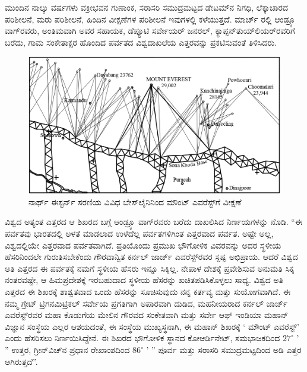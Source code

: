 ಮುಂದಿನ ನಾಲ್ಕು ವರ್ಷಗಳು ವಕ್ರೀಭವನ ಗುಣಾಂಕ, ಸರಾಸರಿ ಸಮುದ್ರಮಟ್ಟದ ಡೇಟಮ್‌ನ ನಿಗಧಿ, ಲೆಕ್ಕಾಚಾರದ ಪರಿಶೀಲನೆ, ಮರು ಪರಿಶೀಲನೆ, ಹಿಂದಿನ ವೀಕ್ಷಣೆಗಳ ಪರಿಶೀಲನೆ ಇವುಗಳಲ್ಲಿ ಕಳೆಯುತ್ತದೆ. ಮಾರ್ಚ್ ರಲ್ಲಿ ಆಂಡ್ರ್ಯೂ ವಾಗ್​ರವರು, ಅಂತಿಮವಾಗಿ ಅವರ ಸಹಾಯಕ, ಡೆಪ್ಯೂಟಿ ಸರ್ವೇಯರ್​ ಜನರಲ್​, ಕ್ಯಾಪ್ಟನ್​ ತುಯ್​ಲಿಯರ್​\break ರವರಿಗೆ ಬರೆದು, ಗಾಮ ಸಂಕೇತಾಕ್ಷರ ಹೊಂದಿದ ಪರ್ವತದ ವಿಶ್ವದಾಖಲೆಯ ಎತ್ತರವನ್ನು ಪ್ರಕಟಿಸುವಂತೆ ತಿಳಿಸಿದರು.

\begin{figure}[!htbp]
\includegraphics{"images/image020.jpg"}
\caption{ನಾರ್ಥ್ ಈಸ್ಟರ್ನ್ ಸರಣಿಯ ವಿವಿಧ ಬೇಸ್‌ಲೈನಿನಿಂದ ಮೌಂಟ್​ ಎವರೆಸ್ಟ್​ಗೆ ವೀಕ್ಷಣೆ}\label{art15-fig2}
\end{figure}

\newpage

ವಿಶ್ವದ ಅತ್ಯಂತ ಎತ್ತರದ ಆ ಶಿಖರದ ಬಗ್ಗೆ ಆಂಡ್ರ್ಯೂ ವಾಗ್​ರವರು ಬರೆದು ದಾಖಲಿಸಿದ ನಿರ್ಣಯಗಳನ್ನು ನೊಡಿ. “ಈ ಪರ್ವತವು ಭಾರತದಲ್ಲಿ ಅಳತೆ ಮಾಡಲಾದ ಉಳೆದೆಲ್ಲ ಪರ್ವತಗಳಿಗಿಂತ ಎತ್ತರವಾದ ಪರ್ವತ. ಅಷ್ಟೇ ಅಲ್ಲ, ವಿಶ್ವದಲ್ಲಿಯೇ ಎತ್ತರವಾದ ಪರ್ವತವಾಗಿದೆ. ಪ್ರತಿಯೊಂದು ಪ್ರಮುಖ ಭೌಗೋಳಿಕ ವಿವರವನ್ನು ಅದರ ಸ್ಥಳೀಯ ಹೆಸರಿನಿಂದಲೇ ಗುರುತಿಸಬೇಕೆಂದು ಗೌರವಾನ್ವಿತ ಕರ್ನಲ್​ ಜಾರ್ಜ್ ಎವರೆಸ್ಟ್​ರವರ ಸ್ಪಷ್ಟ ಅಭಿಪ್ರಾಯ. ಆದರೆ ವಿಶ್ವದ ಅತಿ ಎತ್ತರದ ಈ ಪರ್ವತಕ್ಕೆ ನಮಗೆ ಸ್ಥಳೀಯ ಹೆಸರು ಇನ್ನೂ ಸಿಕ್ಕಿಲ್ಲ. ನೇಪಾಳ ದೇಶಕ್ಕೆ ಪ್ರವೇಶಿಸುವ ಅನುಮತಿ ಸಿಕ್ಕ ನಂತರವಷ್ಟೇ, ಆ ಹಿಮಪ್ರದೇಶಕ್ಕೆ ಇರಬಹುದಾದ ಸ್ಥಳೀಯ ಹೆಸರನ್ನು ಖಚಿತಪಡಿಸಿಕೊಳ್ಳಲು ಸಾಧ್ಯ. ವಿಶ್ವದ ಅತಿ ಎತ್ತರದ ಈ ಶಿಖರಕ್ಕೆ ಶಾಶ್ವತವಾದ ಒಂದು ಹೆಸರನ್ನು ಸೂಚಿಸುವುದು ನನ್ನ ಕರ್ತವ್ಯ ಮತ್ತು ಸುಯೋಗವಾಗಿದೆ. ಈ ನಮ್ಮ ಗ್ರೇಟ್​ ಟ್ರಿಗನಮಿಟ್ರಿಕಲ್​ ಸರ್ವೇಯ ಪ್ರಗತಿಗಾಗಿ ಅಪಾರವಾಗಿ ದುಡಿದ, ಮಹನೀಯರಾದ ಕರ್ನಲ್​ ಜಾರ್ಜ್ ಎವರೆಸ್ಟ್​ರವರ ಮಹಾ ಕೊಡುಗೆಯ ಮೇಲಿನ ಗೌರವದ ಸಂಕೇತವಾಗಿ ಮತ್ತು ಸರ್ವೇ ಆಫ್​ ಇಂಡಿಯಾ ಮಹಾನ್​ ವಿಜ್ಞಾನ ಸಂಸ್ಥೆಯ ಎಲ್ಲರ ಆಶಯದಂತೆ, ಈ ಸಂಸ್ಥೆಯ ಮುಖ್ಯಸ್ಥನಾಗಿ, ಈ ಮಹಾನ್​ ಶಿಖರಕ್ಕೆ ‘ ಮೌಂಟ್​ ಎವರೆಸ್ಟ್​’ ಎಂದು ಹೆಸರಿಸಲು ನಿರ್ಣಯಿಸಿದ್ದೇನೆ. ಈ ಶಿಖರದ ಭೌಗೋಳಿಕ ಸ್ಥಾನದ ಕೋಆರ್ಡಿನೇಟ್​, ಸಮಭಾಜಕದಿಂದ $27^\circ$ ’ ” ಉತ್ತರ, ಗ್ರೀನ್​ವಿಚ್​ನ ಪ್ರಧಾನ ರೇಖಾಂಶದಿಂದ $86^\circ$ ’ ” ಪೂರ್ವ ಮತ್ತು ಸರಾಸರಿ ಸಮುದ್ರಮಟ್ಟದಿಂದ  ಅಡಿ ಎತ್ತರ ಆಗಿರುತ್ತದೆ”.

